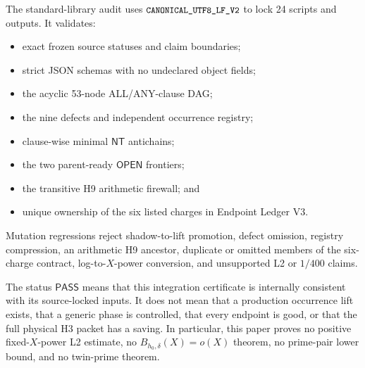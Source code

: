 \documentclass[11pt]{article}
\theoremstyle{definition}
\newcommand{\NT}{\mathsf{NT}}
\newcommand{\OPEN}{\mathsf{OPEN}}
\newcommand{\code}[1]{\texttt{\small #1}}
\begin{document}
The standard-library audit uses
\(\code{CANONICAL\_UTF8\_LF\_V2}\) to lock 24 scripts and outputs.
It validates:
\begin{itemize}[leftmargin=2.1em]
  \item exact frozen source statuses and claim boundaries;
  \item strict JSON schemas with no undeclared object fields;
  \item the acyclic 53-node ALL/ANY-clause DAG;
  \item the nine defects and independent occurrence registry;
  \item clause-wise minimal \(\NT\) antichains;
  \item the two parent-ready \(\OPEN\) frontiers;
  \item the transitive H9 arithmetic firewall; and
  \item unique ownership of the six listed charges in Endpoint Ledger V3.
\end{itemize}
Mutation regressions reject shadow-to-lift promotion, defect omission,
registry compression, an arithmetic H9 ancestor, duplicate or omitted
members of the six-charge contract, log-to-\(X\)-power conversion, and
unsupported L2 or \(1/400\) claims.

The status \(\mathsf{PASS}\) means that this integration certificate
is internally consistent with its source-locked inputs.  It does not
mean that a production occurrence lift exists, that a generic phase
is controlled, that every endpoint is good, or that the full physical
H3 packet has a saving.  In particular, this paper proves no positive
fixed-\(X\)-power L2 estimate, no \(B_{h_0,\delta}(X)=o(X)\) theorem,
no prime-pair lower bound, and no twin-prime theorem.



\end{document}
